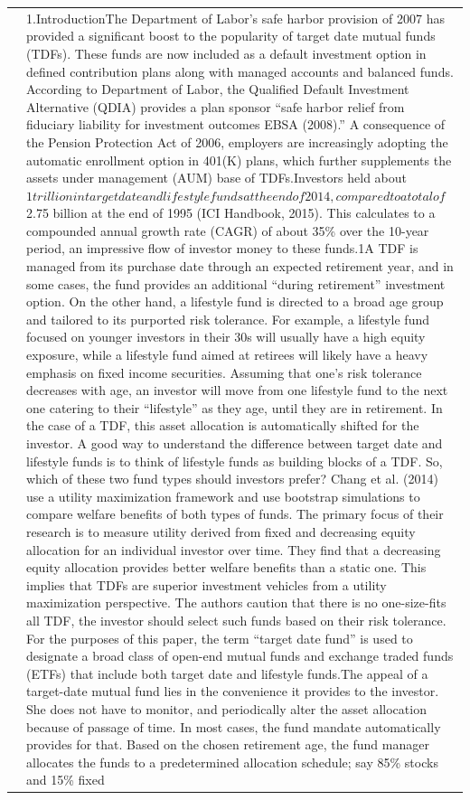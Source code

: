 \documentclass{article}
\begin{document}
\begin{tabular}{p{}p{}}
\cite{Singh_2023} & 1.IntroductionThe Department of Labor's safe harbor provision of 2007 has provided a significant boost to the popularity of target date mutual funds (TDFs). These funds are now included as a default investment option in defined contribution plans along with managed accounts and balanced funds. According to Department of Labor, the Qualified Default Investment Alternative (QDIA) provides a plan sponsor ``safe harbor relief from fiduciary liability for investment outcomes EBSA (2008).'' A consequence of the Pension Protection Act of 2006, employers are increasingly adopting the automatic enrollment option in 401(K) plans, which further supplements the assets under management (AUM) base of TDFs.Investors held about $1 trillion in target date and lifestyle funds at the end of 2014, compared to a total of$2.75 billion at the end of 1995 (ICI Handbook, 2015). This calculates to a compounded annual growth rate (CAGR) of about 35\% over the 10-year period, an impressive flow of investor money to these funds.1A TDF is managed from its purchase date through an expected retirement year, and in some cases, the fund provides an additional ``during retirement'' investment option. On the other hand, a lifestyle fund is directed to a broad age group and tailored to its purported risk tolerance. For example, a lifestyle fund focused on younger investors in their 30s will usually have a high equity exposure, while a lifestyle fund aimed at retirees will likely have a heavy emphasis on fixed income securities. Assuming that one's risk tolerance decreases with age, an investor will move from one lifestyle fund to the next one catering to their ``lifestyle'' as they age, until they are in retirement. In the case of a TDF, this asset allocation is automatically shifted for the investor. A good way to understand the difference between target date and lifestyle funds is to think of lifestyle funds as building blocks of a TDF. So, which of these two fund types should investors prefer? Chang et al. (2014) use a utility maximization framework and use bootstrap simulations to compare welfare benefits of both types of funds. The primary focus of their research is to measure utility derived from fixed and decreasing equity allocation for an individual investor over time. They find that a decreasing equity allocation provides better welfare benefits than a static one. This implies that TDFs are superior investment vehicles from a utility maximization perspective. The authors caution that there is no one-size-fits all TDF, the investor should select such funds based on their risk tolerance. For the purposes of this paper, the term ``target date fund'' is used to designate a broad class of open-end mutual funds and exchange traded funds (ETFs) that include both target date and lifestyle funds.The appeal of a target-date mutual fund lies in the convenience it provides to the investor. She does not have to monitor, and periodically alter the asset allocation because of passage of time. In most cases, the fund mandate automatically provides for that. Based on the chosen retirement age, the fund manager allocates the funds to a predetermined allocation schedule; say 85\% stocks and 15\% fixed 
\end{tabular}
\end{document}
